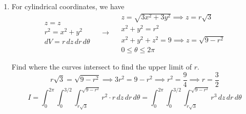 \documentclass[a4paper, 12pt]{article}
\begin{document}
\begin{enumerate}[leftmargin=*,label=\textbf{\arabic*.}]
\begin{enumerate}[leftmargin=*,label=\textbf{\alph*.}]
The integral in spherical coordinates can be expressed as follows.
\[\boxed{{I}=\int_0^{2\pi}\int_0^{\pi/6}\int_{0}^3\rho^2\sin^2\phi\cdot\rho^2\sin\phi\,d\rho\,d\phi\,d\theta=\int_0^{2\pi}\int_0^{\pi/6}\int_{0}^3\rho^4\sin^3\phi\,d\rho\,d\phi\,d\theta}\]

\item For cylindrical coordinates, we have
\[
\begin{array}{c}
z=z\\
r^2=x^2+y^2\\
dV=r\,dz\,dr\,d\theta
\end{array}\quad\rightarrow\quad
\begin{array}{c}
z=\sqrt{3x^2+3y^2}\implies z=r\sqrt3\\[0.1cm]
x^2+y^2=r^2\\[0.1cm]
x^2+y^2+z^2=9\implies z=\sqrt{9-r^2}\\[0.1cm]
0\leq\theta\leq2\pi
\end{array}
\]

Find where the curves intersect to find the upper limit of $r$.
\[r\sqrt3=\sqrt{9-r^2}\implies3r^2=9-r^2\implies r^2=\frac94\implies r=\frac32\]
\[\boxed{{I}=\int_0^{2\pi}\int_0^{3/2}\int_{r\sqrt3}^{\sqrt{9-r^2}}r^2\cdot r\,dz\,dr\,d\theta=\int_0^{2\pi}\int_0^{3/2}\int_{r\sqrt3}^{\sqrt{9-r^2}}r^3\,dz\,dr\,d\theta}\]
\end{enumerate}
\end{enumerate}
\end{document}
